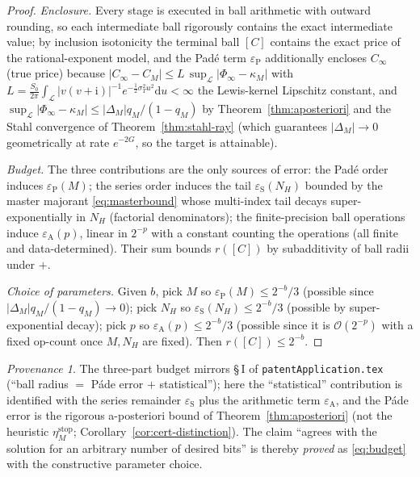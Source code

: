 \documentclass[11pt]{article}
\newcommand{\Ii}{\mathrm{i}}
\newcommand{\dd}{\mathrm{d}}
\theoremstyle{plain}
\theoremstyle{definition}
\theoremstyle{remark}
\newtheorem*{provenance}{Provenance}
\begin{document}
\begin{proof}
\emph{Enclosure.} Every stage is executed in ball arithmetic with outward rounding,
so each intermediate ball rigorously contains the exact intermediate value; by
inclusion isotonicity the terminal ball $[C]$ contains the exact price of the
rational-exponent model, and the Padé term $\varepsilon_{\mathrm P}$ additionally
encloses $C_\infty$ (true price) because $|C_\infty-C_M|\le L\,\sup_{\mathcal L}
|\Phi_\infty-\kappa_M|$ with $L=\frac{S_0}{2\pi}\int_{\mathcal L}|v(v+\Ii)|^{-1}
e^{-\frac12\sigma_T^2u^2}\dd u<\infty$ the Lewis-kernel Lipschitz constant, and
$\sup_{\mathcal L}|\Phi_\infty-\kappa_M|\le|\Delta_M|q_M/(1-q_M)$ by
Theorem~\ref{thm:aposteriori} and the Stahl convergence of
Theorem~\ref{thm:stahl-ray} (which guarantees $|\Delta_M|\to0$ geometrically at
rate $e^{-2G}$, so the target is attainable).

\emph{Budget.} The three contributions are the only sources of error: the Padé
order induces $\varepsilon_{\mathrm P}(M)$; the series order induces the tail
$\varepsilon_{\mathrm S}(N_H)$ bounded by the master majorant \eqref{eq:masterbound}
whose multi-index tail decays super-exponentially in $N_H$ (factorial denominators);
the finite-precision ball operations induce $\varepsilon_{\mathrm A}(p)$, linear in
$2^{-p}$ with a constant counting the operations (all finite and data-determined).
Their sum bounds $r([C])$ by subadditivity of ball radii under $+$.

\emph{Choice of parameters.} Given $b$, pick $M$ so $\varepsilon_{\mathrm P}(M)\le
2^{-b}/3$ (possible since $|\Delta_M|q_M/(1-q_M)\to0$); pick $N_H$ so
$\varepsilon_{\mathrm S}(N_H)\le2^{-b}/3$ (possible by super-exponential decay);
pick $p$ so $\varepsilon_{\mathrm A}(p)\le2^{-b}/3$ (possible since it is
$\mathcal O(2^{-p})$ with a fixed op-count once $M,N_H$ are fixed). Then
$r([C])\le2^{-b}$.
\end{proof}
\begin{provenance}
The three-part budget mirrors \S\,I of \texttt{patentApplication.tex} (``ball
radius $=$ P\'ade error $+$ statistical''); here the ``statistical'' contribution is
identified with the series remainder $\varepsilon_{\mathrm S}$ plus the arithmetic
term $\varepsilon_{\mathrm A}$, and the P\'ade error is the rigorous a-posteriori
bound of Theorem~\ref{thm:aposteriori} (not the heuristic
$\eta_M^{\mathrm{stop}}$; Corollary~\ref{cor:cert-distinction}). The claim
``agrees with the solution for an arbitrary number of desired bits'' is thereby
\emph{proved} as \eqref{eq:budget} with the constructive parameter choice.
\end{provenance}
\end{document}
